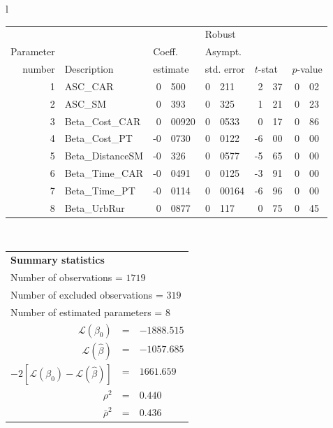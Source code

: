   \begin{tabular}{l}
\begin{tabular}{rlr@{.}lr@{.}lr@{.}lr@{.}l}
         &                       &   \multicolumn{2}{l}{}    & \multicolumn{2}{l}{Robust}  &     \multicolumn{4}{l}{}   \\
Parameter &                       &   \multicolumn{2}{l}{Coeff.}      & \multicolumn{2}{l}{Asympt.}  &     \multicolumn{4}{l}{}   \\
number &  Description                     &   \multicolumn{2}{l}{estimate}      & \multicolumn{2}{l}{std. error}  &   \multicolumn{2}{l}{$t$-stat}  &   \multicolumn{2}{l}{$p$-value}   \\

\hline

1 & ASC_CAR & 0&500 & 0&211 & 2&37 & 0&02\\
2 & ASC_SM & 0&393 & 0&325 & 1&21 & 0&23\\
3 & Beta_Cost_CAR & 0&00920 & 0&0533 & 0&17 & 0&86\\
4 & Beta_Cost_PT & -0&0730 & 0&0122 & -6&00 & 0&00\\
5 & Beta_DistanceSM & -0&326 & 0&0577 & -5&65 & 0&00\\
6 & Beta_Time_CAR & -0&0491 & 0&0125 & -3&91 & 0&00\\
7 & Beta_Time_PT & -0&0114 & 0&00164 & -6&96 & 0&00\\
8 & Beta_UrbRur & 0&0877 & 0&117 & 0&75 & 0&45\\
\hline
\end{tabular}
\\
\begin{tabular}{rcl}
\multicolumn{3}{l}{\bf Summary statistics}\\
\multicolumn{3}{l}{ Number of observations = $1719$} \\
\multicolumn{3}{l}{ Number of excluded observations = $319$} \\
\multicolumn{3}{l}{ Number of estimated  parameters = $8$} \\
 $\mathcal{L}(\beta_0)$ &=&  $-1888.515$ \\
 $\mathcal{L}(\hat{\beta})$ &=& $-1057.685 $  \\
 $-2[\mathcal{L}(\beta_0) -\mathcal{L}(\hat{\beta})]$ &=& $1661.659$ \\
    $\rho^2$ &=&   $0.440$ \\
    $\bar{\rho}^2$ &=&    $0.436$ \\
\end{tabular}
  \end{tabular}

